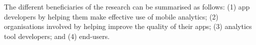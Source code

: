 The different beneficiaries of the research can be summarised as follows: (1) app developers by helping them make effective use of mobile analytics; (2) organisations involved by helping improve the quality of their apps; (3) analytics tool developers; and (4) end-users.




